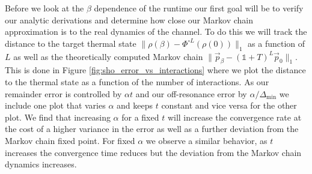 \documentclass{article}
\newcommand{\norm}[1]{\| #1 \|}
\newcommand{\identity}{\mathds{1}}
\begin{document}
Before we look at the $\beta$ dependence of the runtime our first goal will be to verify our analytic derivations and determine how close our Markov chain approximation is to the real dynamics of the channel. To do this we will track the distance to the target thermal state $\norm{\rho(\beta) - \Phi^{\circ L}(\rho(0))}_1$ as a function of $L$ as well as the theoretically computed Markov chain $\norm{\vec{p}_{\beta} - (\identity + T)^L \vec{p}_0}_1 $. This is done in Figure \ref{fig:sho_error_vs_interactions} where we plot the distance to the thermal state as a function of the number of interactions. As our remainder error is controlled by $\alpha t$ and our off-resonance error by $\alpha / \Delta_{\min}$ we include one plot that varies $\alpha$ and keeps $t$ constant and vice versa for the other plot. We find that increasing $\alpha$ for a fixed $t$ will increase the convergence rate at the cost of a higher variance in the error as well as a further deviation from the Markov chain fixed point. For fixed $\alpha$ we observe a similar behavior, as $t$ increases the convergence time reduces but the deviation from the Markov chain dynamics increases.
\end{document}

